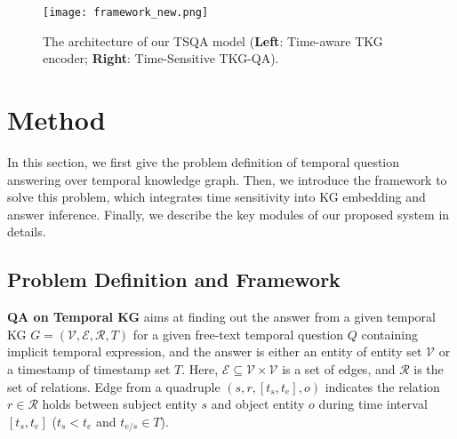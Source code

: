 \documentclass[11pt]{article}
\newcommand{\xhdrnd}[1]{{\noindent\bfseries #1}} %
\newcommand{\peng}[1]{{{\color{purple!60!blue}{[peng: #1]}}}}
\newcommand{\jing}[1]{{{\textcolor{red}{[jing: #1]}}}}
\begin{document}
\begin{figure*}[ht]
  \centering
  \texttt{[image: framework\_new.png]}
  \caption{The architecture of our TSQA model (\textbf{Left}: Time-aware TKG encoder; \textbf{Right}: Time-Sensitive TKG-QA). 
  }
  \label{fig:architecture}
\end{figure*}


\section{Method}



In this section, we first give the problem definition of temporal question answering over temporal knowledge graph. Then, we introduce the framework to solve this problem, which %
integrates time sensitivity into KG embedding and answer inference. Finally, we describe the key modules of our proposed system in details.  



\subsection{Problem Definition and Framework}

\xhdrnd{QA on Temporal KG} aims at finding out the answer from a given temporal KG $G = (\mathcal{V}, \mathcal{E}, \mathcal{R}, T)$ for a given free-text temporal question $Q$ containing implicit temporal expression, and the answer is either an entity of entity set $\mathcal{V}$ or a timestamp of timestamp set $T$. Here, $\mathcal{E} \subseteq \mathcal{V} \times \mathcal{V}$ is a set of edges, and $\mathcal{R}$ is the set of relations. 
Edge from a quadruple $(s, r, [t_s, t_e], o)$ indicates the relation $r\in \mathcal{R}$ holds between subject entity $s$ and object entity $o$ during time interval $[t_s, t_e]$ ($t_s < t_e$ and $t_{e/s}\in T$).
\end{document}
